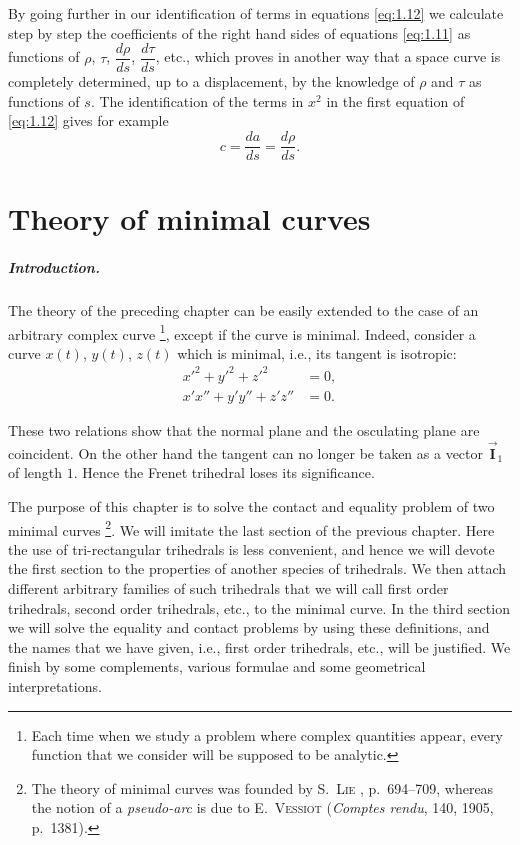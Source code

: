 \documentclass[leqno,11pt]{book}
\numberwithin{equation}{chapter}
\theoremstyle{shape1}
\theoremstyle{shapesmall}
\newcommand{\rvec}[1]{\vec{\mathbf{#1}}}
\newcommand{\ivec}{\rvec{I}}
\begin{document}
By going further in our identification of terms in equations \eqref{eq:1.12} we calculate step by step the coefficients of the right hand sides of equations \eqref{eq:1.11} as functions of $\rho$, $\tau$, $\dfrac{d\rho}{ds}$, $\dfrac{d\tau}{ds}$, etc., which proves in another way that a space curve is completely determined, up to a displacement, by the knowledge of $\rho$ and $\tau$ as functions of $s$. The identification of the terms in $x^{2}$ in the first equation of \eqref{eq:1.12} gives for example
\[
c=\frac{da}{ds}=\frac{d\rho}{ds}.
\]

\chapter{Theory of minimal curves}
\label{cha:theory-minim-curv}

\paragraph{Introduction.}
\label{sec:22}
The theory of the preceding chapter can be easily extended to the case of an arbitrary complex curve \footnote{Each time when we study a problem where complex quantities appear, every function that we consider will be supposed to be analytic.}, except if the curve is minimal. Indeed, consider a curve $x(t)$, $y(t)$, $z(t)$ which is minimal, i.e., its tangent is isotropic:
\begin{align}
  \label{eq:2.1}
  x'^{2}+y'^{2}+z'^{2}&=0,\\
  x'x''+y'y''+z'z''&=0.
  \label{eq:2.2}
\end{align}

These two relations show that the normal plane and the osculating plane are coincident. On the other hand the tangent can no longer be taken as a vector $\ivec_{1}$ of length $1$. Hence the Frenet trihedral loses its significance.

The purpose of this chapter is to solve the contact and equality problem of two minimal curves \footnote{The theory of minimal curves was founded by \textsc{S.~Lie} \cite{4}, p.~694--709, whereas the notion of a \emph{pseudo-arc} is due to \textsc{E.~Vessiot} (\emph{Comptes rendu}, 140, 1905, p.~1381).}. We will imitate the last section of the previous chapter. Here the use of tri-rectangular trihedrals is less convenient, and hence we will devote the first section to the properties of another species of trihedrals. We then attach different arbitrary families of such trihedrals that we will call first order trihedrals, second order trihedrals, etc., to the minimal curve. In the third section we will solve the equality and contact problems by using these definitions, and the names that we have given, i.e., first order trihedrals, etc., will be justified. We finish by some complements, various formulae and some geometrical interpretations.
\end{document}
